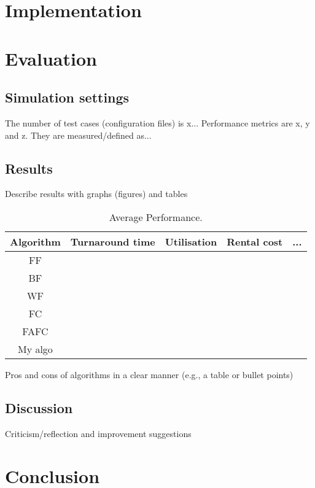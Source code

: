\documentclass[a4paper]{article} %
\begin{document}
\section{Implementation}

\section{Evaluation}

\subsection{Simulation settings}
The number of test cases (configuration files) is x...
Performance metrics are x, y and z. They are measured/defined as...

\subsection{Results}
Describe results with graphs (figures) and tables

\begin{table}[h!]
    \centering
    \begin{tabular}{|c|c|c|c|c|}
    \hline
        Algorithm & Turnaround time & Utilisation & Rental cost & ... \\
    \hline
    FF &&&& \\\hline
    BF &&&& \\\hline
    WF &&&& \\\hline
    FC &&&& \\\hline
    FAFC &&&& \\\hline
    My algo &&&& \\\hline
    \end{tabular}
    \label{tab:my_label}
    \caption{Average Performance.}
\end{table}

Pros and cons of algorithms in a clear manner (e.g., a table or bullet points)

\subsection{Discussion}
Criticism/reflection and improvement suggestions


\section{Conclusion}




\end{document}
